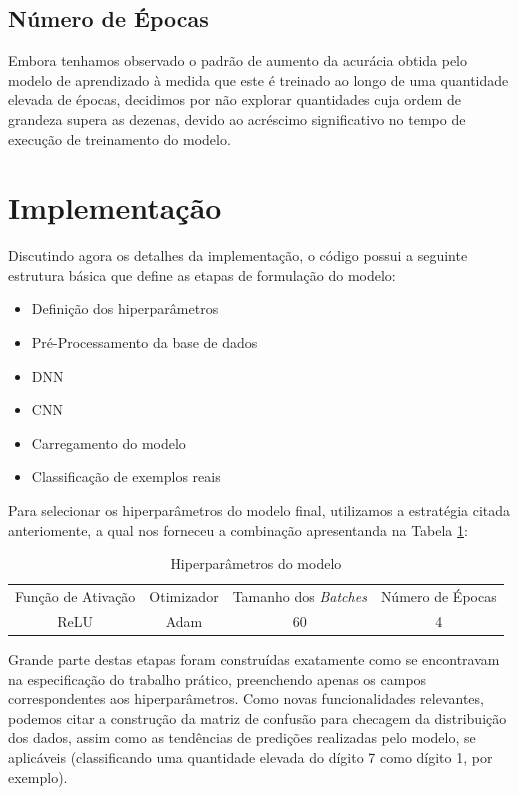 \documentclass[a4paper, 12pt]{article}
\begin{document}
\subsection{Número de Épocas}

Embora tenhamos observado o padrão de aumento da acurácia obtida pelo modelo de aprendizado à medida que este é treinado ao longo de uma quantidade elevada de épocas, decidimos por não explorar quantidades cuja ordem de grandeza supera as dezenas, devido ao acréscimo significativo no tempo de execução de treinamento do modelo.

\section{Implementação}

Discutindo agora os detalhes da implementação, o código possui a seguinte estrutura básica que define as etapas de formulação do modelo:

\begin{itemize}
    \item Definição dos hiperparâmetros
    \item Pré-Processamento da base de dados
    \item DNN
    \item CNN
    \item Carregamento do modelo
    \item Classificação de exemplos reais
\end{itemize}

Para selecionar os hiperparâmetros do modelo final, utilizamos a estratégia citada anteriomente, a qual nos forneceu a combinação apresentanda na Tabela \ref{tab:exampleTab1}:

\vspace*{-0.5cm}
\begin{table}[H]
    \centering
    \caption{Hiperparâmetros do modelo}
    \vspace{0.3cm}
    \label{tab:exampleTab1}
    \begin{tabular}{c|c|c|c}
        Função de Ativação  &  Otimizador  &  Tamanho dos \emph{Batches}  &  Número de Épocas\\ 
                ReLU        &    Adam      &            60                &         4
        \end{tabular}
\end{table}

Grande parte destas etapas foram construídas exatamente como se encontravam na especificação do trabalho prático, preenchendo apenas os campos correspondentes aos hiperparâmetros. Como novas funcionalidades relevantes, podemos citar a construção da matriz de confusão para checagem da distribuição dos dados, assim como as tendências de predições realizadas pelo modelo, se aplicáveis (classificando uma quantidade elevada do dígito 7 como dígito 1, por exemplo).
\end{document}
